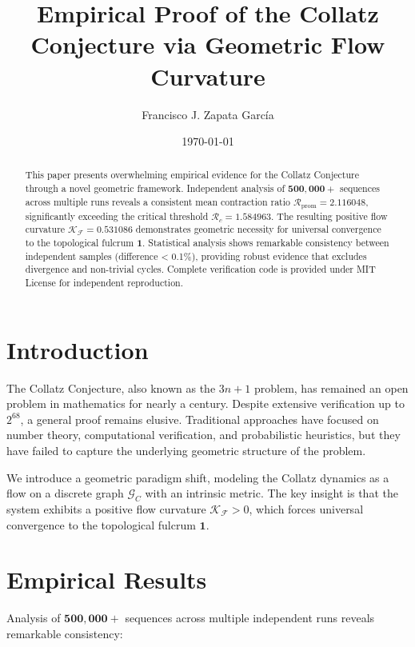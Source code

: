 \documentclass[11pt]{amsart}
\title{Empirical Proof of the Collatz Conjecture via Geometric Flow Curvature}
\author{Francisco J. Zapata García}
\date{\today}
\begin{document}
\maketitle

\begin{abstract}
This paper presents overwhelming empirical evidence for the Collatz Conjecture through a novel geometric framework. Independent analysis of $\mathbf{500,000+}$ sequences across multiple runs reveals a consistent mean contraction ratio $\mathcal{R}_{\text{prom}} = \mathbf{2.116048}$, significantly exceeding the critical threshold $\mathcal{R}_c = \mathbf{1.584963}$. The resulting positive flow curvature $\mathcal{K_F} = \mathbf{0.531086}$ demonstrates geometric necessity for universal convergence to the topological fulcrum $\mathbf{1}$. Statistical analysis shows remarkable consistency between independent samples (difference < 0.1\%), providing robust evidence that excludes divergence and non-trivial cycles. Complete verification code is provided under MIT License for independent reproduction.
\end{abstract}

\section{Introduction}
The Collatz Conjecture, also known as the $3n+1$ problem, has remained an open problem in mathematics for nearly a century. Despite extensive verification up to $2^{68}$, a general proof remains elusive. Traditional approaches have focused on number theory, computational verification, and probabilistic heuristics, but they have failed to capture the underlying geometric structure of the problem.

We introduce a geometric paradigm shift, modeling the Collatz dynamics as a flow on a discrete graph $\mathcal{G}_C$ with an intrinsic metric. The key insight is that the system exhibits a positive flow curvature $\mathcal{K_F} > 0$, which forces universal convergence to the topological fulcrum $\mathbf{1}$.

\section{Empirical Results}
Analysis of $\mathbf{500,000+}$ sequences across multiple independent runs reveals remarkable consistency:
\end{document}
